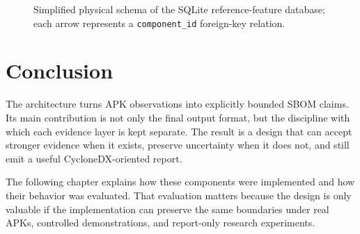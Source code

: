 \begin{figure}[H]
{%
}
\caption{Simplified physical schema of the SQLite reference-feature database;
each arrow represents a \texttt{component\_id} foreign-key relation.}
\label{fig:pfe-reference-schema}
\end{figure}

\section{Conclusion}

The architecture turns APK observations into explicitly bounded SBOM claims.
Its main contribution is not only the final output format, but the discipline
with which each evidence layer is kept separate. The result is a design that
can accept stronger evidence when it exists, preserve uncertainty when it
does not, and still emit a useful CycloneDX-oriented report.

The following chapter explains how these components were implemented and how
their behavior was evaluated. That evaluation matters because the design is
only valuable if the implementation can preserve the same boundaries under
real APKs, controlled demonstrations, and report-only research experiments.
